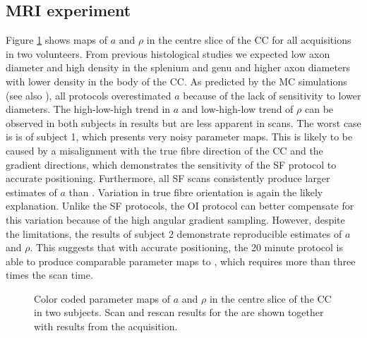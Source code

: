 \subsection{MRI experiment}
Figure \ref{fig:experiment4:maps} shows maps of $a$ and $\rho$ in the centre slice of the \gls{CC} for all acquisitions in two volunteers. From previous histological studies \cite{Aboitiz:1992} we expected low axon diameter and high density in the splenium and genu and higher axon diameters with lower density in the body of the \gls{CC}. As predicted by the MC simulations (see also \citet{Alexander:2010}), all protocols overestimated $a$ because of the lack of sensitivity to lower diameters. The high-low-high trend in $a$ and low-high-low trend of $\rho$ can be observed in both subjects in \OIlong{} results but are less apparent in \SFshort{} scans. The worst case is is \SFshort{} of subject 1, which presents very noisy parameter maps. This is likely to be caused by a misalignment with the true fibre direction of the \gls{CC} and the gradient directions, which demonstrates the sensitivity of the SF protocol to accurate positioning. Furthermore, all SF scans consistently produce larger estimates of $a$ than \OIlong{}. Variation in true fibre orientation is again the likely explanation. Unlike the SF protocols, the OI protocol can better compensate for this variation because of the high angular gradient sampling. However, despite the limitations, the results of subject 2 demonstrate reproducible estimates of $a$ and $\rho$. This suggests that with accurate positioning, the 20 minute \SFshort{} protocol is able to produce comparable parameter maps to \OIlong, which requires more than three times the scan time.
\begin{figure}
 \centering
  \caption{Color coded parameter maps of $a$ and $\rho$ in the centre slice of the CC in two subjects. Scan and rescan results for the \SFshort{} are shown together with results from the \OIlong{} acquisition.}
  \label{fig:experiment4:maps}
\end{figure}
